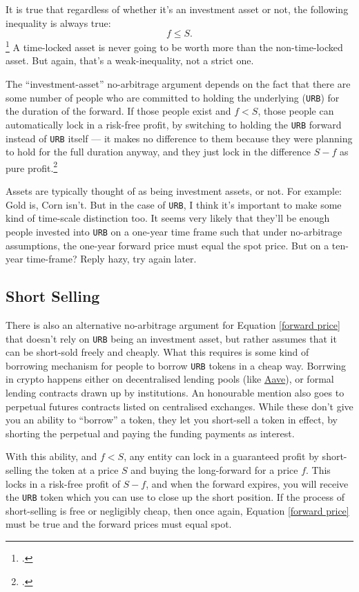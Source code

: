 \documentclass{article}
\begin{document}
	It is true that regardless of whether it's an investment asset or not, the following inequality is always true:
	\begin{equation}
		f \leq S.
	\end{equation}\footcite[143]{hull}
	A time-locked asset is never going to be worth more than the non-time-locked asset. But again, that's a weak-inequality, not a strict one.
	
	The ``investment-asset'' no-arbitrage argument depends on the fact that there are some number of people who are committed to holding the underlying (\texttt{URB}) for the duration of the forward. If those people exist and $f < S$, those people can automatically lock in a risk-free profit, by switching to holding the \texttt{URB} forward instead of \texttt{URB} itself --- it makes no difference to them because they were planning to hold for the full duration anyway, and they just lock in the difference $S - f$ as pure profit.\footcite[129]{hull}
	
	Assets are typically thought of as being investment assets, or not. For example: Gold is, Corn isn't. But in the case of \texttt{URB}, I think it's important to make some kind of time-scale distinction too. It seems very likely that they'll be enough people invested into \texttt{URB} on a one-year time frame such that under no-arbitrage assumptions, the one-year forward price must equal the spot price. But on a ten-year time-frame? Reply hazy, try again later.
	
	\subsection{Short Selling}
	There is also an alternative no-arbitrage argument for Equation \ref{forward price} that doesn't rely on \texttt{URB} being an investment asset, but rather assumes that it can be short-sold freely and cheaply. What this requires is some kind of borrowing mechanism for people to borrow \texttt{URB} tokens in a cheap way. Borrwing in crypto happens either on decentralised lending pools (like \href{https://app.aave.com/}{Aave}), or formal lending contracts drawn up by institutions. An honourable mention also goes to perpetual futures contracts listed on centralised exchanges. While these don't give you an ability to ``borrow'' a token, they let you short-sell a token in effect, by shorting the perpetual and paying the funding payments as interest. 
	
	With this ability, and $f < S$, any entity can lock in a guaranteed profit by short-selling the token at a price $S$ and buying the long-forward for a price $f$. This locks in a risk-free profit of $S - f$, and when the forward expires, you will receive the \texttt{URB} token which you can use to close up the short position. If the process of short-selling is free or negligibly cheap, then once again, Equation \ref{forward price} must be true and the forward prices must equal spot.
	
\end{document}
